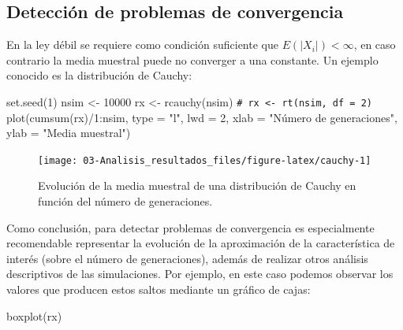 \documentclass[
  10pt,
]{book}
\newenvironment{Shaded}{\begin{snugshade}}{\end{snugshade}}
\newcommand{\AttributeTok}[1]{\textcolor[rgb]{0.77,0.63,0.00}{#1}}
\newcommand{\CommentTok}[1]{\textcolor[rgb]{0.56,0.35,0.01}{\textit{#1}}}
\newcommand{\DecValTok}[1]{\textcolor[rgb]{0.00,0.00,0.81}{#1}}
\newcommand{\FunctionTok}[1]{\textcolor[rgb]{0.00,0.00,0.00}{#1}}
\newcommand{\NormalTok}[1]{#1}
\newcommand{\OtherTok}[1]{\textcolor[rgb]{0.56,0.35,0.01}{#1}}
\newcommand{\SpecialCharTok}[1]{\textcolor[rgb]{0.00,0.00,0.00}{#1}}
\newcommand{\StringTok}[1]{\textcolor[rgb]{0.31,0.60,0.02}{#1}}
\theoremstyle{break}
\theoremstyle{nonumberplain}
\renewcommand{\CommentTok}[1]{\textcolor[rgb]{0.41,0.41,0.41}{\texttt{#1}}}
\begin{document}
\hypertarget{detecciuxf3n-de-problemas-de-convergencia}{%
\subsection{Detección de problemas de convergencia}\label{detecciuxf3n-de-problemas-de-convergencia}}

En la ley débil se requiere como condición suficiente que \(E\left( \left\vert X_{i} \right\vert \right) < \infty\), en caso contrario la media muestral puede no converger a una constante.
Un ejemplo conocido es la distribución de Cauchy:

\begin{Shaded}
\begin{Highlighting}[]
\FunctionTok{set.seed}\NormalTok{(}\DecValTok{1}\NormalTok{)}
\NormalTok{nsim }\OtherTok{\textless{}{-}} \DecValTok{10000}
\NormalTok{rx }\OtherTok{\textless{}{-}} \FunctionTok{rcauchy}\NormalTok{(nsim) }\CommentTok{\# rx \textless{}{-} rt(nsim, df = 2)}
\FunctionTok{plot}\NormalTok{(}\FunctionTok{cumsum}\NormalTok{(rx)}\SpecialCharTok{/}\DecValTok{1}\SpecialCharTok{:}\NormalTok{nsim, }\AttributeTok{type =} \StringTok{"l"}\NormalTok{, }\AttributeTok{lwd =} \DecValTok{2}\NormalTok{, }
     \AttributeTok{xlab =} \StringTok{"Número de generaciones"}\NormalTok{, }\AttributeTok{ylab =} \StringTok{"Media muestral"}\NormalTok{)}
\end{Highlighting}
\end{Shaded}

\begin{figure}[!htbp]

{\centering \texttt{[image: 03-Analisis\_resultados\_files/figure-latex/cauchy-1]} 

}

\caption{Evolución de la media muestral de una distribución de Cauchy en función del número de generaciones.}\label{fig:cauchy}
\end{figure}

Como conclusión, para detectar problemas de convergencia es especialmente recomendable representar la evolución de la aproximación de la característica de interés (sobre el número de generaciones),
además de realizar otros análisis descriptivos de las simulaciones.
Por ejemplo, en este caso podemos observar los valores que producen estos saltos mediante un gráfico de cajas:

\begin{Shaded}
\begin{Highlighting}[]
\FunctionTok{boxplot}\NormalTok{(rx)}
\end{Highlighting}
\end{Shaded}
\end{document}
